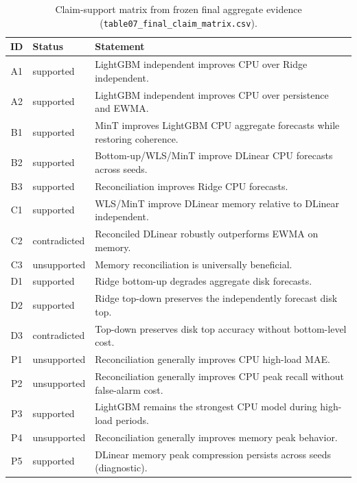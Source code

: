 \begin{table}[t]
\centering
\caption{Claim-support matrix from frozen final aggregate evidence (\texttt{table07\_final\_claim\_matrix.csv}).}
\label{tab:claim_support}
\scriptsize
\begin{tabular}{@{}clp{5.6cm}@{}}
\toprule
ID & Status & Statement \\
\midrule

A1 & supported & LightGBM independent improves CPU over Ridge independent. \\
A2 & supported & LightGBM independent improves CPU over persistence and EWMA. \\
B1 & supported & MinT improves LightGBM CPU aggregate forecasts while restoring coherence. \\
B2 & supported & Bottom-up/WLS/MinT improve DLinear CPU forecasts across seeds. \\
B3 & supported & Reconciliation improves Ridge CPU forecasts. \\
C1 & supported & WLS/MinT improve DLinear memory relative to DLinear independent. \\
C2 & contradicted & Reconciled DLinear robustly outperforms EWMA on memory. \\
C3 & unsupported & Memory reconciliation is universally beneficial. \\
D1 & supported & Ridge bottom-up degrades aggregate disk forecasts. \\
D2 & supported & Ridge top-down preserves the independently forecast disk top. \\
D3 & contradicted & Top-down preserves disk top accuracy without bottom-level cost. \\
P1 & unsupported & Reconciliation generally improves CPU high-load MAE. \\
P2 & unsupported & Reconciliation generally improves CPU peak recall without false-alarm cost. \\
P3 & supported & LightGBM remains the strongest CPU model during high-load periods. \\
P4 & unsupported & Reconciliation generally improves memory peak behavior. \\
P5 & supported & DLinear memory peak compression persists across seeds (diagnostic). \\
\bottomrule
\end{tabular}
\end{table}
